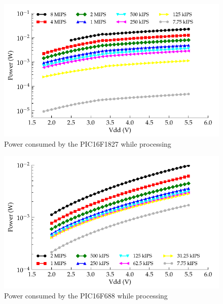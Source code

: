 \begin{figure}
\begin{centering}
\includegraphics{content/pt1/02-Microcontrollers/graphics/Graph_PIC16F1827_Clock_Power}
\par\end{centering}

\protect\caption{\label{graph:CLK_POWER_16F1827}Power consumed by the PIC16F1827 while
processing}
\end{figure}
\begin{figure}
\begin{centering}
\includegraphics{content/pt1/02-Microcontrollers/graphics/Graph_PIC16F688_Clock_Power}
\par\end{centering}

\protect\caption{\label{graph:CLK_POWER_16F688}Power consumed by the PIC16F688 while
processing}
\end{figure}
